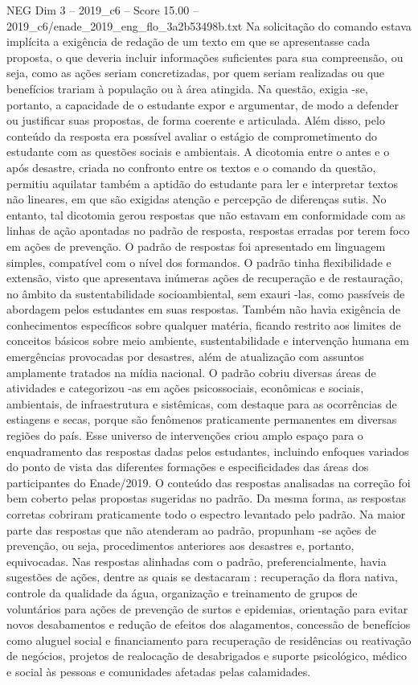 \begin{textsample}{NEG Dim 3 – 2019\_c6 – Score 15.00 – 2019\_c6/enade\_2019\_eng\_flo\_3a2b53498b.txt}
Na solicitação do comando estava implícita a exigência de redação de um texto em que se apresentasse cada proposta, o que deveria incluir informações suficientes para sua compreensão, ou seja, como as ações seriam concretizadas, por quem seriam realizadas ou que benefícios trariam à população ou à área atingida.
Na questão, exigia -se, portanto, a capacidade de o estudante expor e argumentar, de modo a defender ou justificar suas propostas, de forma coerente e articulada.
Além disso, pelo conteúdo da resposta era possível avaliar o estágio de comprometimento do estudante com as questões sociais e ambientais.
A dicotomia entre o antes e o após desastre, criada no confronto entre os textos e o comando da questão, permitiu aquilatar também a aptidão do estudante para ler e interpretar textos não lineares, em que são exigidas atenção e percepção de diferenças sutis.
No entanto, tal dicotomia gerou respostas que não estavam em conformidade com as linhas de ação apontadas no padrão de resposta, respostas erradas por terem foco em ações de prevenção.
O padrão de respostas foi apresentado em linguagem simples, compatível com o nível dos formandos.
O padrão tinha flexibilidade e extensão, visto que apresentava inúmeras ações de recuperação e de restauração, no âmbito da sustentabilidade socioambiental, sem exauri -las, como passíveis de abordagem pelos estudantes em suas respostas.
Também não havia exigência de conhecimentos específicos sobre qualquer matéria, ficando restrito aos limites de conceitos básicos sobre meio ambiente, sustentabilidade e intervenção humana em emergências provocadas por desastres, além de atualização com assuntos amplamente tratados na mídia nacional.
O padrão cobriu diversas áreas de atividades e categorizou -as em ações psicossociais, econômicas e sociais, ambientais, de infraestrutura e sistêmicas, com destaque para as ocorrências de estiagens e secas, porque são fenômenos praticamente permanentes em diversas regiões do país.
Esse universo de intervenções criou amplo espaço para o enquadramento das respostas dadas pelos estudantes, incluindo enfoques variados do ponto de vista das diferentes formações e especificidades das áreas dos participantes do Enade/2019.
O conteúdo das respostas analisadas na correção foi bem coberto pelas propostas sugeridas no padrão.
Da mesma forma, as respostas corretas cobriram praticamente todo o espectro levantado pelo padrão.
Na maior parte das respostas que não atenderam ao padrão, propunham -se ações de prevenção, ou seja, procedimentos anteriores aos desastres e, portanto, equivocadas.
Nas respostas alinhadas com o padrão, preferencialmente, havia sugestões de ações, dentre as quais se destacaram : recuperação da flora nativa, controle da qualidade da água, organização e treinamento de grupos de voluntários para ações de prevenção de surtos e epidemias, orientação para evitar novos desabamentos e redução de efeitos dos alagamentos, concessão de benefícios como aluguel social e financiamento para recuperação de residências ou reativação de negócios, projetos de realocação de desabrigados e suporte psicológico, médico e social às pessoas e comunidades afetadas pelas calamidades.

\end{textsample}
